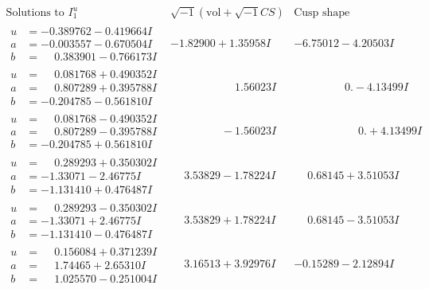 \documentclass[1p]{elsarticle_modified}
\theoremstyle{definition}
\newcommand{\I}{\sqrt{-1}}
\begin{document}
$$\begin{array}{c|c|c}
\text{Solutions to }I^u_{1}& \I (\text{vol} + \sqrt{-1}CS) & \text{Cusp shape}\\
 \hline 
\begin{aligned}
u &= -0.389762 - 0.419664 I \\
a &= -0.003557 - 0.670504 I \\
b &= \phantom{-}0.383901 - 0.766173 I\end{aligned}
 & -1.82900 + 1.35958 I & -6.75012 - 4.20503 I \\ \hline\begin{aligned}
u &= \phantom{-}0.081768 + 0.490352 I \\
a &= \phantom{-}0.807289 + 0.395788 I \\
b &= -0.204785 - 0.561810 I\end{aligned}
 & \phantom{-0.000000 -}1.56023 I & \phantom{-0.000000 } 0. - 4.13499 I \\ \hline\begin{aligned}
u &= \phantom{-}0.081768 - 0.490352 I \\
a &= \phantom{-}0.807289 - 0.395788 I \\
b &= -0.204785 + 0.561810 I\end{aligned}
 & \phantom{-0.000000 } -1.56023 I & \phantom{-0.000000 -}0. + 4.13499 I \\ \hline\begin{aligned}
u &= \phantom{-}0.289293 + 0.350302 I \\
a &= -1.33071 - 2.46775 I \\
b &= -1.131410 + 0.476487 I\end{aligned}
 & \phantom{-}3.53829 - 1.78224 I & \phantom{-}0.68145 + 3.51053 I \\ \hline\begin{aligned}
u &= \phantom{-}0.289293 - 0.350302 I \\
a &= -1.33071 + 2.46775 I \\
b &= -1.131410 - 0.476487 I\end{aligned}
 & \phantom{-}3.53829 + 1.78224 I & \phantom{-}0.68145 - 3.51053 I \\ \hline\begin{aligned}
u &= \phantom{-}0.156084 + 0.371239 I \\
a &= \phantom{-}1.74465 + 2.65310 I \\
b &= \phantom{-}1.025570 - 0.251004 I\end{aligned}
 & \phantom{-}3.16513 + 3.92976 I & -0.15289 - 2.12894 I \\ \hline\begin{aligned}

\end{aligned}
\end{array}$$
\end{document}
